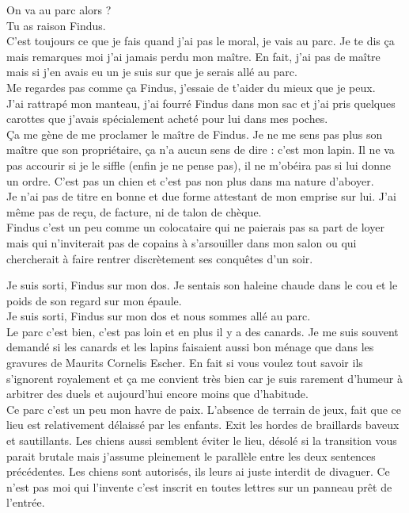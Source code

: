On va au parc alors ? \\

Tu as raison Findus. \\
C'est toujours ce que je fais quand j'ai pas le moral, je vais au parc. Je te dis ça mais remarques moi j'ai jamais perdu mon maître. En fait, j'ai pas de maître mais si j'en avais eu un je suis sur que je serais allé au parc.\\
Me regardes pas comme ça Findus, j'essaie de t'aider du mieux que je peux. \\

J'ai rattrapé mon manteau, j'ai fourré Findus dans mon sac et j'ai pris quelques carottes que j'avais spécialement acheté pour lui dans mes poches. \\

Ça me gène de me proclamer le maître de Findus. Je ne me sens pas plus son maître que son propriétaire, ça n'a aucun sens de dire : c'est mon lapin. Il ne va pas accourir si je le siffle (enfin je ne pense pas), il ne m'obéira pas si lui donne un ordre. C'est pas un chien et c'est pas non plus dans ma nature d'aboyer. \\
Je n'ai pas de titre en bonne et due forme attestant de mon emprise sur lui. J'ai même pas de reçu, de facture, ni de talon de chèque. \\
Findus c'est un peu comme un colocataire qui ne paierais pas sa part de loyer mais qui n'inviterait pas de copains à s'arsouiller dans mon salon ou qui chercherait à faire rentrer discrètement ses conquêtes d'un soir.

Je suis sorti, Findus sur mon dos. Je sentais son haleine chaude dans le cou et le poids de son regard sur mon épaule. \\
Je suis sorti, Findus sur mon dos et nous sommes allé au parc. \\

Le parc c'est bien, c'est pas loin et en plus il y a des canards. Je me suis souvent demandé si les canards et les lapins faisaient aussi bon ménage que dans les gravures de Maurits Cornelis Escher. En fait si vous voulez tout savoir ils s'ignorent royalement et ça me convient très bien car je suis rarement d'humeur à arbitrer des duels et aujourd'hui encore moins que d'habitude. \\
Ce parc c'est un peu mon havre de paix. L’absence de terrain de jeux, fait que ce lieu est relativement délaissé par les enfants. Exit les hordes de braillards baveux et sautillants. Les chiens aussi semblent éviter le lieu, désolé si la transition vous parait brutale mais j'assume pleinement le parallèle entre les deux sentences précédentes. Les chiens sont autorisés, ils leurs ai juste interdit de divaguer. Ce n'est pas moi qui l'invente c'est inscrit en toutes lettres sur un panneau prêt de l'entrée. \\

